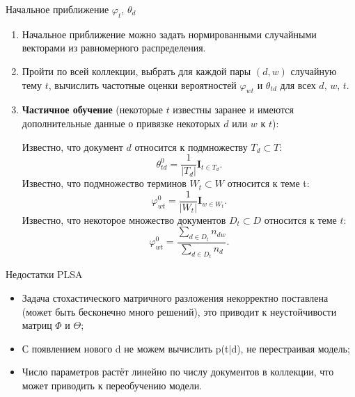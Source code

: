 \documentclass{beamer}
\begin{document}
\begin{frame}{Начальное приближение $\varphi_t$, $\theta_d$}
\footnotesize
\begin{enumerate}
    \item Начальное приближение можно задать нормированными случайными векторами из равномерного распределения.
    \item Пройти по всей коллекции, выбрать для каждой пары $(d, w)$ случайную тему $t$, вычислить частотные оценки вероятностей $\varphi_{wt}$ и $\theta_{td}$ для всех $d,\, w,\, t$.
    \item \textbf{Частичное обучение} (некоторые $t$ известны заранее и имеются дополнительные данные о привязке некоторых $d$ или $w$ к $t$):
    
    Известно, что документ $d$ относится к подмножеству $T_d \subset T$:
        \begin{equation*}
        \theta_{td}^{0} = \frac{1}{|T_d|}\mathbf{I}_{t \in T_d}.
        \end{equation*}
    Известно, что подмножество терминов $W_t \subset W$ относится к теме t:
        \begin{equation*}
        \varphi_{wt}^{0} = \frac{1}{|W_t|}\mathbf{I}_{w \in W_t}.
        \end{equation*}
    Известно, что некоторое множество документов $D_t \subset D$ относится к теме $t$:
        \begin{equation*}
        \varphi_{wt}^{0} = \frac{\sum_{d \in D_t}n_{dw}}{\sum_{d \in D_t}n_{d}}.
        \end{equation*}
    
\end{enumerate}
\end{frame}

\begin{frame}{Недостатки PLSA}
\begin{itemize}
    \item Задача стохастического матричного разложения некорректно поставлена (может быть бесконечно много решений), это приводит к неустойчивости матриц $\Phi$ и $\Theta$;
    \vspace{2\ex}
    \item С появлением нового d не можем вычислить p(t|d), не перестраивая модель;
    \vspace{2\ex}
    \item Число параметров растёт линейно по числу документов в коллекции, что может приводить к переобучению модели.
\end{itemize}
\end{frame}
\end{document}
